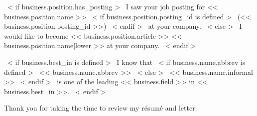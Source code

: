 ~< if business.position.has_posting >~
    I saw your job posting for << business.position.name >>
    ~< if business.position.posting_id is defined >~ (<< business.position.posting_id >>) ~< endif >~ at your company.
~< else >~
    I would like to become << business.position.article >> << business.position.name|lower >> at your company.
~< endif >~

~< if business.best_in is defined >~
    I know that
    ~< if business.name.abbrev is defined >~
        << business.name.abbrev >>
    ~< else >~
        << business.name.informal >>
    ~< endif >~
    is one of the leading << business.field >> in << business.best_in >>.
~< endif >~



Thank you for taking the time to review my résumé and letter.
